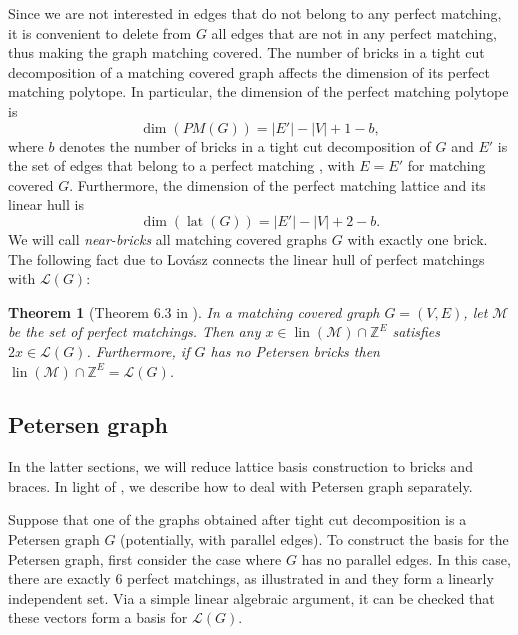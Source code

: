 \documentclass[11pt]{article}
\DeclareMathOperator{\lat}{lat}
\DeclareMathOperator{\lin}{lin}
\newcommand{\1}{\mathbf{1}}
\newcommand{\0}{\mathbf{0}}
\newcommand{\zL}{\mathcal L}
\newcommand{\Z}{\mathbb{Z}}
\newtheorem{theorem}{Theorem}[section]
\begin{document}
Since we are not interested in edges that do not belong to any perfect matching, it is convenient to delete from $G$ all edges that are not in any perfect matching, thus making the graph matching covered.
The number of bricks in a tight cut decomposition of a matching covered graph affects the dimension of its perfect matching polytope. In particular, the dimension of the perfect matching polytope is \begin{equation}\label{eq:pm-dimension}
    \dim(PM(G)) = |E'|-|V|+1-b,
\end{equation} where $b$ denotes the number of bricks in a tight cut decomposition of $G$ and $E'$ is the set of edges that belong to a perfect matching \cite{edmonds1982brick}, with $E=E'$ for matching covered $G$. Furthermore, the dimension of the perfect matching lattice and its linear hull is \begin{equation}\label{eq:pm-lat-dimension}
    \dim (\lat(G)) = |E'|-|V|+2-b.
\end{equation}
We will call \emph{near-bricks} all matching covered graphs $G$ with exactly one brick.
The following fact due to Lov\'asz connects the linear hull of perfect matchings with $\zL(G)$: \begin{theorem}[Theorem $6.3$ in \cite{lovaszPM}]\label{thm:lovasz}
    In a matching covered graph $G=(V,E)$, let $\mathcal{M}$ be the set of perfect matchings. Then any $x \in \lin(\mathcal{M})\cap \Z^E$ satisfies $2x\in \zL(G)$. Furthermore, if $G$ has no Petersen bricks then $\lin(\mathcal{M})\cap \Z^E=\zL(G)$. 
\end{theorem}

\subsection{Petersen graph}

In the latter sections, we will reduce lattice basis construction to bricks and braces. In light of , we describe how to deal with Petersen graph separately.

Suppose that one of the graphs obtained after tight cut decomposition is a Petersen graph $G$ (potentially, with parallel edges). To construct the basis for the Petersen graph, first consider the case where $G$ has no parallel edges. In this case, there are exactly $6$ perfect matchings, as illustrated in  and they form a linearly independent set. Via a simple linear algebraic argument, it can be checked that these vectors form a basis for $\zL(G)$.
\end{document}
